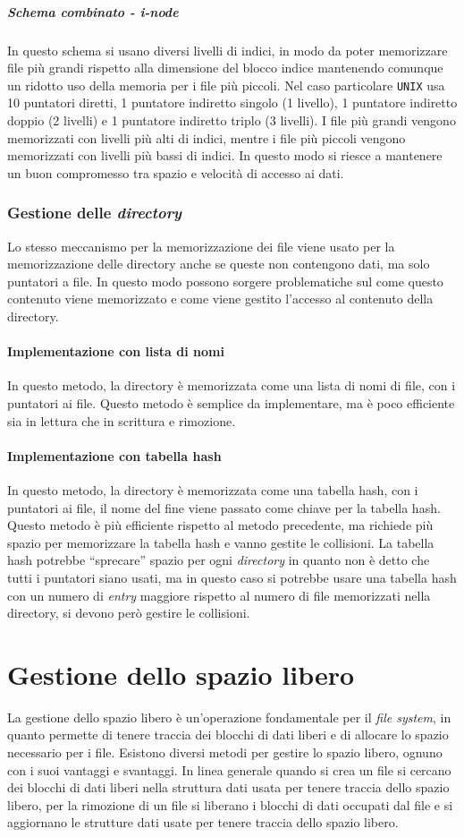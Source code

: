             \subparagraph{Schema combinato - i-node} In questo schema si usano diversi livelli di indici, in modo da poter memorizzare file più grandi rispetto alla dimensione del blocco indice mantenendo comunque un ridotto uso della memoria per i file più piccoli. Nel caso particolare \texttt{UNIX} usa 10 puntatori diretti, 1 puntatore indiretto singolo (1 livello), 1 puntatore indiretto doppio (2 livelli) e 1 puntatore indiretto triplo (3 livelli). I file più grandi vengono memorizzati con livelli più alti di indici, mentre i file più piccoli vengono memorizzati con livelli più bassi di indici. In questo modo si riesce a mantenere un buon compromesso tra spazio e velocità di accesso ai dati.
    \subsubsection{Gestione delle \textit{directory}}
        Lo stesso meccanismo per la memorizzazione dei file viene usato per la memorizzazione delle directory anche se queste non contengono dati, ma solo puntatori a file. In questo modo possono sorgere problematiche sul come questo contenuto viene memorizzato e come viene gestito l'accesso al contenuto della directory. 
        \paragraph{Implementazione con lista di nomi} In questo metodo, la directory è memorizzata come una lista di nomi di file, con i puntatori ai file. Questo metodo è semplice da implementare, ma è poco efficiente sia in lettura che in scrittura e rimozione.
        \paragraph{Implementazione con tabella hash} In questo metodo, la directory è memorizzata come una tabella hash, con i puntatori ai file, il nome del fine viene passato come chiave per la tabella hash. Questo metodo è più efficiente rispetto al metodo precedente, ma richiede più spazio per memorizzare la tabella hash e vanno gestite le collisioni. La tabella hash potrebbe ``sprecare'' spazio per ogni \textit{directory} in quanto non è detto che tutti i puntatori siano usati, ma in questo caso si potrebbe usare una tabella hash con un numero di \textit{entry} maggiore rispetto al numero di file memorizzati nella directory, si devono però gestire le collisioni.


\section{Gestione dello spazio libero}
    La gestione dello spazio libero è un'operazione fondamentale per il \textit{file system}, in quanto permette di tenere traccia dei blocchi di dati liberi e di allocare lo spazio necessario per i file. Esistono diversi metodi per gestire lo spazio libero, ognuno con i suoi vantaggi e svantaggi. In linea generale quando si crea un file si cercano dei blocchi di dati liberi nella struttura dati usata per tenere traccia dello spazio libero, per la rimozione di un file si liberano i blocchi di dati occupati dal file e si aggiornano le strutture dati usate per tenere traccia dello spazio libero.
